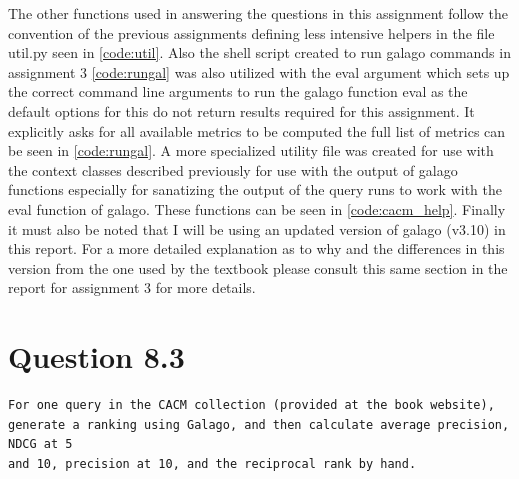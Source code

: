 \documentclass[11pt]{article}
\begin{document}
The other functions used in answering the questions in this assignment follow the convention of the previous assignments defining less intensive helpers in the file util.py seen in \autoref{code:util}.  Also the shell script created to run galago commands in assignment 3 \autoref{code:rungal} was also utilized with the eval argument which sets up the correct command line arguments to run the galago function eval as the  default options for this do not return results required for this assignment. It explicitly asks for all available metrics to be computed the full list of metrics can be seen in \autoref{code:rungal}. A more specialized utility file was created for use with the context classes described previously for use with the output of galago functions especially for sanatizing the output of the query runs to work with the eval function of galago. These functions can be seen in \autoref{code:cacm_help}.  \newline \newline Finally it must also be noted that I will be using an updated version of galago (v3.10) in this report. For a more detailed explanation as to why and the differences in this version from the one used by the textbook please consult this same section in the report for assignment 3 for more details.
\newpage
\section{Question 8.3} \label{q1}
\begin{verbatim}
For one query in the CACM collection (provided at the book website), 
generate a ranking using Galago, and then calculate average precision, NDCG at 5
and 10, precision at 10, and the reciprocal rank by hand.
\end{verbatim}
\end{document}
